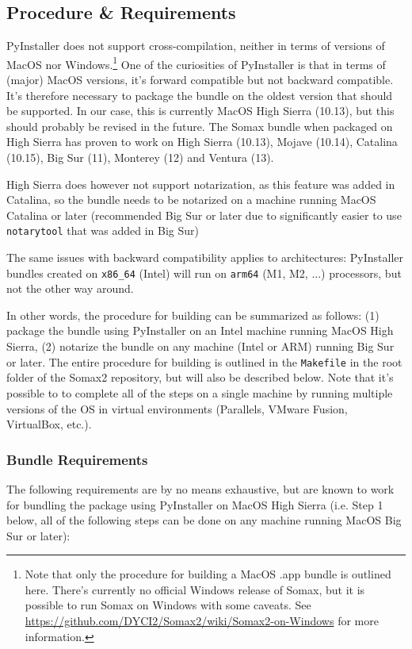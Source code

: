 \subsection{Procedure \& Requirements}\label{ssec:2-pyinstaller-procedure}

PyInstaller does not support cross-compilation, neither in terms of versions of MacOS nor Windows.\footnote{Note that only the procedure for building a MacOS .app bundle is outlined here. There's currently no official Windows release of Somax, but it is possible to run Somax on Windows with some caveats. See \url{https://github.com/DYCI2/Somax2/wiki/Somax2-on-Windows} for more information.} One of the curiosities of PyInstaller is that in terms of (major) MacOS versions, it's forward compatible but not backward compatible. It's therefore necessary to package the bundle on the oldest version that should be supported. In our case, this is currently MacOS High Sierra (10.13), but this should probably be revised in the future. The Somax bundle when packaged on High Sierra has proven to work on High Sierra (10.13), Mojave (10.14), Catalina (10.15), Big Sur (11), Monterey (12) and Ventura (13). 

High Sierra does however not support notarization, as this feature was added in Catalina, so the bundle needs to be notarized on a machine running MacOS Catalina or later (recommended Big Sur or later due to significantly easier to use \texttt{notarytool} that was added in Big Sur)

The same issues with backward compatibility applies to architectures: PyInstaller bundles created on \texttt{x86\_64} (Intel) will run on \texttt{arm64} (M1, M2, ...) processors, but not the other way around. 

In other words, the procedure for building can be summarized as follows: (1) package the bundle using PyInstaller on an Intel machine running MacOS High Sierra, (2) notarize the bundle on any machine (Intel or ARM) running Big Sur or later. The entire procedure for building is outlined in the \texttt{Makefile} in the root folder of the Somax2 repository, but will also be described below. Note that it's possible to to complete all of the steps on a single machine by running multiple versions of the OS in virtual environments (Parallels, VMware Fusion, VirtualBox, etc.).

\subsubsection{Bundle Requirements}
The following requirements are by no means exhaustive, but are known to work for bundling the package using PyInstaller on MacOS High Sierra (i.e. Step 1 below, all of the following steps can be done on any machine running MacOS Big Sur or later):

